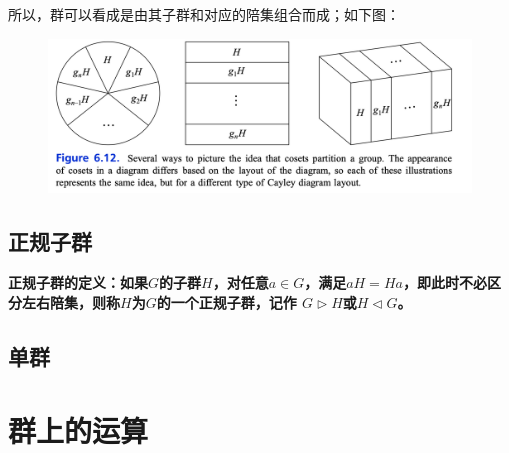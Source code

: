 \documentclass[12pt]{article}
\begin{document}
所以，群可以看成是由其子群和对应的陪集组合而成；如下图：
\begin{figure}[H]
    \centering
    \includegraphics[width=1\textwidth]{fig/Group/Group-Decomposition.png}
\end{figure}


\subsection{正规子群}
\begin{mdframed}[
linecolor=black!40,outerlinewidth=1pt,roundcorner=.5em,innertopmargin=1ex,innerbottommargin=.5\baselineskip,innerrightmargin=1em,innerleftmargin=1em,backgroundcolor=gray!5,
]
\textbf{
正规子群的定义：如果$G$的子群$H$，对任意$a \in G$，满足$aH = Ha$，即此时不必区分左右陪集，则称$H$为$G$的一个正规子群，记作 $G \rhd H$或$H \lhd G$。
}
\end{mdframed}

\subsection{单群}

\section{群上的运算}
\end{document}

